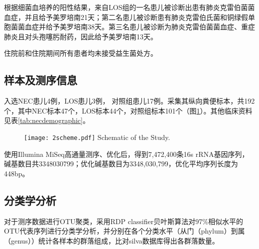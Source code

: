     根据细菌血培养的阳性结果，来自LOS组的一名患儿被诊断出患有肺炎克雷伯菌菌血症，并且给予美罗培南21天；第二名患儿被诊断患有肺炎克雷伯氏菌和铜绿假单胞菌菌血症并给予美罗培南38天。第三名患儿被诊断为肺炎克雷伯菌菌血症、重症肺炎且对头孢噻肟耐药，因此给予美罗培南13天。

    住院前和住院期间所有患者均未接受益生菌处方。

  \subsection{样本及测序信息}
  入选NEC患儿4例，LOS患儿3例， 对照组患儿17例。采集其纵向粪便标本，共192个，其中NEC标本47个，LOS标本44个，对照组标本101个（图\ref{fig:2scheme}）。其他临床资料见表\ref{tab:necdemographic}。
  \begin{figure}[!htp]
    \centering
    \texttt{[image: 2scheme.pdf]}
      {Schematic of the Study.}
    \label{fig:2scheme}
  \end{figure}


  使用Illumina MiSeq高通量测序、优化后，得到7,472,400条16s rRNA基因序列，碱基数目共3348030799；优化碱基数目为3348,030,799，优化平均序列长度为448bp。
  \subsection{分类学分析}
  对于测序数据进行OTU聚类，采用RDP classifier贝叶斯算法对97\%相似水平的OTU代表序列进行分类学分析，并分别在各个分类水平（从门（phylum）到属（genus））统计各样本的群落组成，比对silva数据库得出各群落数量。
